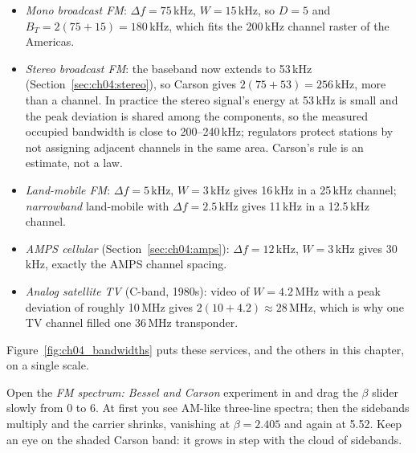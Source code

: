 
\begin{worked}
\begin{itemize}
\item \emph{Mono broadcast FM}: $\Delta f=75$\,kHz, $W=15$\,kHz, so $D=5$ and $B_T=2(75+15)=180$\,kHz,
which fits the 200\,kHz channel raster of the Americas.
\item \emph{Stereo broadcast FM}: the baseband now extends to 53\,kHz (Section~\ref{sec:ch04:stereo}), so
Carson gives $2(75+53)=256$\,kHz, more than a channel. In practice the stereo signal's energy at 53\,kHz is
small and the peak deviation is shared among the components, so the measured occupied bandwidth is close
to 200--240\,kHz; regulators protect stations by not assigning adjacent channels in the same area.
Carson's rule is an estimate, not a law.
\item \emph{Land-mobile FM}: $\Delta f=5$\,kHz, $W=3$\,kHz gives 16\,kHz in a 25\,kHz channel;
\emph{narrowband} land-mobile with $\Delta f=2.5$\,kHz gives 11\,kHz in a 12.5\,kHz channel.
\item \emph{AMPS cellular} (Section~\ref{sec:ch04:amps}): $\Delta f=12$\,kHz, $W=3$\,kHz gives 30\,kHz,
exactly the AMPS channel spacing.
\item \emph{Analog satellite TV} (C-band, 1980s): video of $W=4.2$\,MHz with a peak deviation of roughly
10\,MHz gives $2(10+4.2)\approx28$\,MHz, which is why one TV channel filled one 36\,MHz transponder.
\end{itemize}
\end{worked}

Figure~\ref{fig:ch04_bandwidths} puts these services, and the others in this chapter, on a single scale.


\begin{tryit}
Open the \emph{FM spectrum: Bessel and Carson} experiment in  and drag the $\beta$
slider slowly from 0 to 6. At first you see AM-like three-line spectra; then the sidebands multiply and the
carrier shrinks, vanishing at $\beta=2.405$ and again at 5.52. Keep an eye on the shaded Carson band: it
grows in step with the cloud of sidebands.
\end{tryit}

